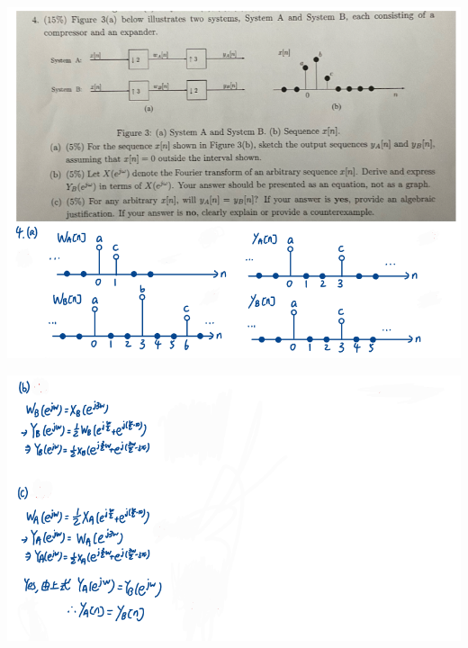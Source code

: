 \documentclass[a4paper]{article}
\begin{document}
	
	\begin{center}
		\includegraphics[width=1\linewidth]{screenshot129}
	\end{center}
	\begin{center}
		\includegraphics[width=1\linewidth]{screenshot130}
	\end{center}
	
\end{document}
